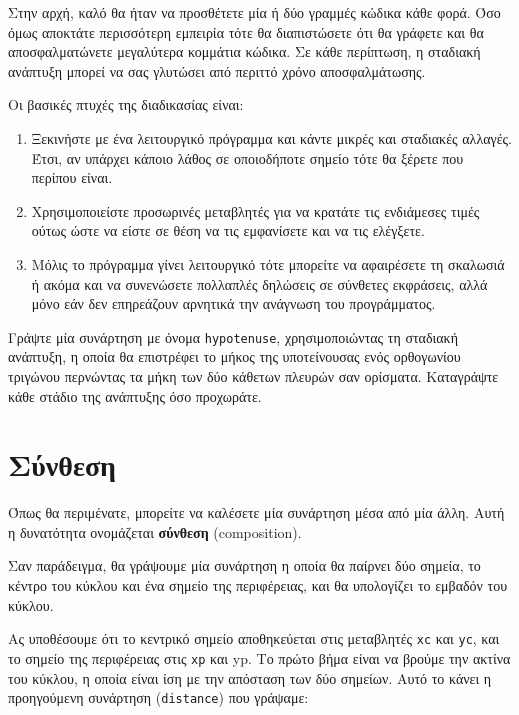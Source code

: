 \documentclass[10pt]{book}
\begin{document}
Στην αρχή, καλό θα ήταν να προσθέτετε μία ή δύο γραμμές κώδικα κάθε φορά.
Όσο όμως αποκτάτε περισσότερη εμπειρία τότε θα διαπιστώσετε ότι θα γράφετε και
θα αποσφαλματώνετε μεγαλύτερα κομμάτια κώδικα. Σε κάθε περίπτωση, η σταδιακή ανάπτυξη μπορεί να σας γλυτώσει από περιττό χρόνο αποσφαλμάτωσης.

Οι βασικές πτυχές της διαδικασίας είναι:

\begin{enumerate}

\item  Ξεκινήστε με ένα λειτουργικό πρόγραμμα και κάντε μικρές και
σταδιακές αλλαγές. Έτσι, αν υπάρχει κάποιο λάθος σε οποιοδήποτε σημείο τότε θα
ξέρετε που περίπου είναι.

\item  Χρησιμοποιείστε προσωρινές μεταβλητές για να κρατάτε τις ενδιάμεσες
τιμές ούτως ώστε να είστε σε θέση να τις εμφανίσετε και να τις ελέγξετε.

\item  Μόλις το πρόγραμμα γίνει λειτουργικό τότε μπορείτε να αφαιρέσετε τη
σκαλωσιά ή ακόμα και να συνενώσετε πολλαπλές δηλώσεις σε σύνθετες εκφράσεις, αλλά μόνο εάν δεν επηρεάζουν αρνητικά την ανάγνωση του προγράμματος.
\\
\end{enumerate}


\begin{exercise}

Γράψτε μία συνάρτηση με όνομα {\tt hypotenuse}, χρησιμοποιώντας τη σταδιακή ανάπτυξη, η οποία θα επιστρέφει το μήκος της υποτείνουσας ενός
ορθογωνίου τριγώνου περνώντας τα μήκη των δύο κάθετων πλευρών σαν ορίσματα.
Καταγράψτε κάθε στάδιο της ανάπτυξης όσο προχωράτε.
\end{exercise}

\section{Σύνθεση}

Όπως θα περιμένατε, μπορείτε να καλέσετε μία συνάρτηση μέσα από
μία άλλη. Αυτή η δυνατότητα ονομάζεται {\bf σύνθεση} (composition). 

Σαν παράδειγμα, θα γράψουμε μία συνάρτηση η οποία θα παίρνει δύο σημεία,
το κέντρο του κύκλου και ένα σημείο της περιφέρειας, και θα υπολογίζει
το εμβαδόν του κύκλου.

Ας υποθέσουμε ότι το κεντρικό σημείο αποθηκεύεται στις μεταβλητές {\tt xc}
και {\tt yc}, και το σημείο της περιφέρειας στις {\tt xp} και {yp}. 
Το πρώτο βήμα είναι να βρούμε την ακτίνα του κύκλου, η οποία είναι ίση με την απόσταση των δύο σημείων. Αυτό το κάνει η προηγούμενη συνάρτηση ({\tt distance}) που γράψαμε:
\end{document}
